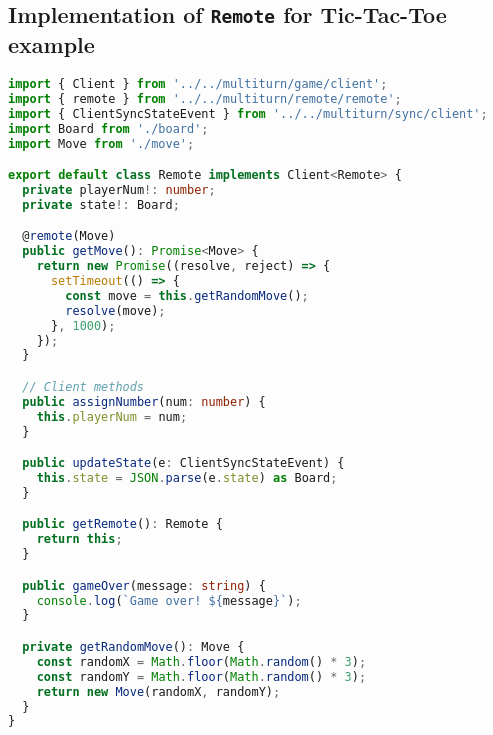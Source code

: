 \documentclass{article}
\begin{document}
\subsection{Implementation of \texttt{Remote} for Tic-Tac-Toe example}
\begin{lstlisting}[language=Typescript]
import { Client } from '../../multiturn/game/client';
import { remote } from '../../multiturn/remote/remote';
import { ClientSyncStateEvent } from '../../multiturn/sync/client';
import Board from './board';
import Move from './move';

export default class Remote implements Client<Remote> {
  private playerNum!: number;
  private state!: Board;

  @remote(Move)
  public getMove(): Promise<Move> {
    return new Promise((resolve, reject) => {
      setTimeout(() => {
        const move = this.getRandomMove();
        resolve(move);
      }, 1000);
    });
  }

  // Client methods
  public assignNumber(num: number) {
    this.playerNum = num;
  }

  public updateState(e: ClientSyncStateEvent) {
    this.state = JSON.parse(e.state) as Board;
  }

  public getRemote(): Remote {
    return this;
  }

  public gameOver(message: string) {
    console.log(`Game over! ${message}`);
  }

  private getRandomMove(): Move {
    const randomX = Math.floor(Math.random() * 3);
    const randomY = Math.floor(Math.random() * 3);
    return new Move(randomX, randomY);
  }
}

\end{lstlisting}
\end{document}
